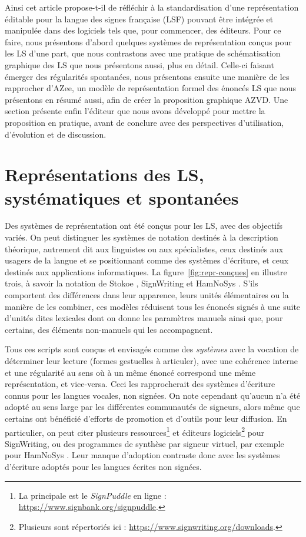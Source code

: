 \documentclass[french,utf8x]{article}
\begin{document}
Ainsi cet article propose-t-il de réfléchir à la standardisation d'une représentation éditable pour la langue des signes française (LSF) pouvant être intégrée et manipulée dans des logiciels tels que, pour commencer, des éditeurs.
Pour ce faire, nous présentons d'abord quelques systèmes de représentation conçus pour les LS d'une part, que nous contrastons avec une pratique de schématisation graphique des LS que nous présentons aussi, plus en détail.
Celle-ci faisant émerger des régularités spontanées, nous présentons ensuite une manière de les rapprocher d'AZee, un modèle de représentation formel des énoncés LS que nous présentons en résumé aussi, afin de créer la proposition graphique AZVD.
Une section présente enfin l'éditeur que nous avons développé pour mettre la proposition en pratique, avant de conclure avec des perspectives d'utilisation, d'évolution et de discussion.


\section{Représentations des LS, systématiques et spontanées}

Des systèmes de représentation ont été conçus pour les LS, avec des objectifs variés.
On peut distinguer les systèmes de notation destinés à la description théorique, autrement dit aux linguistes ou aux spécialistes, ceux destinés aux usagers de la langue et se positionnant comme des systèmes d'écriture, et ceux destinés aux applications informatiques.
La figure~\ref{fig:repr-conçues} en illustre trois, à savoir la notation de Stokoe \cite{stokoe65-dict}, SignWriting \cite{sutton14-textBook} et HamNoSys \cite{pri89,Hanke04-HamNoSys}.
S'ils comportent des différences dans leur apparence, leurs unités élémentaires ou la manière de les combiner, ces modèles réduisent tous les énoncés signés à une suite d'unités dites lexicales dont on donne les paramètres manuels \cite{sto60} ainsi que, pour certains, des éléments non-manuels qui les accompagnent.

Tous ces scripts sont conçus et envisagés comme des \emph{systèmes} avec la vocation de déterminer leur lecture (formes gestuelles à articuler), avec une cohérence interne et une régularité au sens où à un même énoncé correspond une même représentation, et vice-versa.
Ceci les rapprocherait des systèmes d'écriture connus pour les langues vocales, non signées.
On note cependant qu'aucun n'a été adopté au sens large par les différentes communautés de signeurs, alors même que certains ont bénéficié d'efforts de promotion et d'outils pour leur diffusion.
En particulier, on peut citer plusieurs ressources\footnote{La principale est le \emph{SignPuddle} en ligne : \url{https://www.signbank.org/signpuddle}.} et éditeurs logiciels\footnote{Plusieurs sont répertoriés ici : \url{https://www.signwriting.org/downloads}.} pour SignWriting, ou des programmes de synthèse par signeur virtuel, par exemple pour HamNoSys \cite{ell08}.
Leur manque d'adoption contraste donc avec les systèmes d'écriture adoptés pour les langues écrites non signées.
\end{document}
